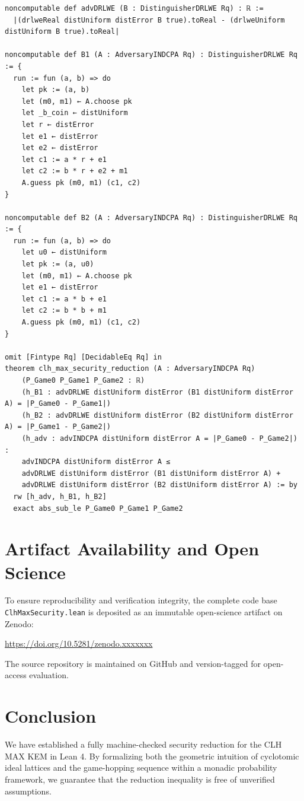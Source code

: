 \documentclass[11pt,a4paper]{article}
\begin{document}
\begin{lstlisting}[caption={Complete verified security reduction in Lean 4}, label={lst:lean-code}]
noncomputable def advDRLWE (B : DistinguisherDRLWE Rq) : ℝ :=
  |(drlweReal distUniform distError B true).toReal - (drlweUniform distUniform B true).toReal|

noncomputable def B1 (A : AdversaryINDCPA Rq) : DistinguisherDRLWE Rq := {
  run := fun (a, b) => do
    let pk := (a, b)
    let (m0, m1) ← A.choose pk
    let _b_coin ← distUniform 
    let r ← distError
    let e1 ← distError
    let e2 ← distError
    let c1 := a * r + e1
    let c2 := b * r + e2 + m1 
    A.guess pk (m0, m1) (c1, c2)
}

noncomputable def B2 (A : AdversaryINDCPA Rq) : DistinguisherDRLWE Rq := {
  run := fun (a, b) => do
    let u0 ← distUniform
    let pk := (a, u0)
    let (m0, m1) ← A.choose pk
    let e1 ← distError
    let c1 := a * b + e1 
    let c2 := b * b + m1
    A.guess pk (m0, m1) (c1, c2)
}

omit [Fintype Rq] [DecidableEq Rq] in
theorem clh_max_security_reduction (A : AdversaryINDCPA Rq)
    (P_Game0 P_Game1 P_Game2 : ℝ)
    (h_B1 : advDRLWE distUniform distError (B1 distUniform distError A) = |P_Game0 - P_Game1|)
    (h_B2 : advDRLWE distUniform distError (B2 distUniform distError A) = |P_Game1 - P_Game2|)
    (h_adv : advINDCPA distUniform distError A = |P_Game0 - P_Game2|) :
    advINDCPA distUniform distError A ≤ 
    advDRLWE distUniform distError (B1 distUniform distError A) + 
    advDRLWE distUniform distError (B2 distUniform distError A) := by
  rw [h_adv, h_B1, h_B2]
  exact abs_sub_le P_Game0 P_Game1 P_Game2
\end{lstlisting}

\section{Artifact Availability and Open Science}
To ensure reproducibility and verification integrity, the complete code base \texttt{ClhMaxSecurity.lean} is deposited as an immutable open-science artifact on Zenodo:
\begin{center}
\url{https://doi.org/10.5281/zenodo.xxxxxxx}
\end{center}
The source repository is maintained on GitHub and version-tagged for open-access evaluation.

\section{Conclusion}
We have established a fully machine-checked security reduction for the \textsc{CLH MAX} KEM in Lean 4. By formalizing both the geometric intuition of cyclotomic ideal lattices and the game-hopping sequence within a monadic probability framework, we guarantee that the reduction inequality is free of unverified assumptions.
\end{document}
